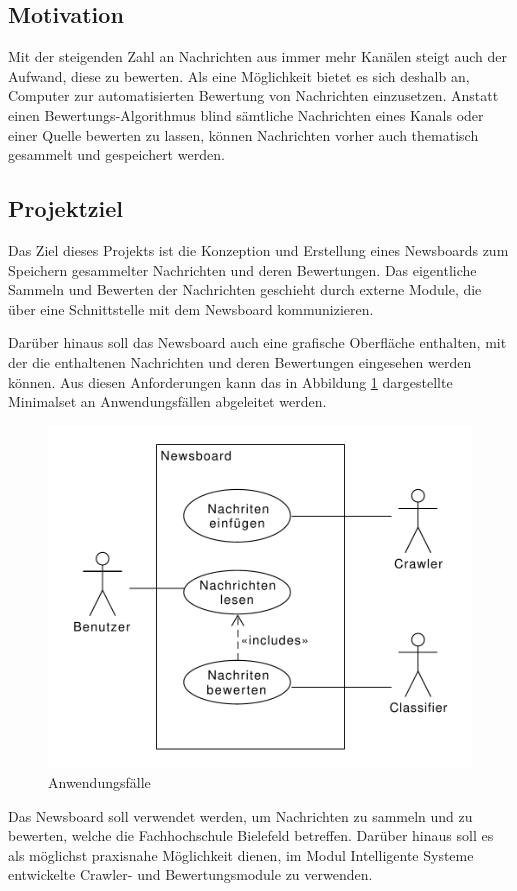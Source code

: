 \subsection{Motivation}
Mit der steigenden Zahl an Nachrichten aus immer mehr Kanälen steigt auch der Aufwand,
diese zu bewerten. Als eine Möglichkeit bietet es sich deshalb an,
Computer zur automatisierten Bewertung von Nachrichten einzusetzen.
Anstatt einen Bewertungs-Algorithmus blind sämtliche Nachrichten eines Kanals
oder einer Quelle bewerten zu lassen, können Nachrichten vorher auch thematisch gesammelt
und gespeichert werden.

\subsection{Projektziel}
Das Ziel dieses Projekts ist die Konzeption und Erstellung eines Newsboards zum Speichern
gesammelter Nachrichten und deren Bewertungen. Das eigentliche Sammeln
und Bewerten der Nachrichten geschieht durch externe Module,
die über eine Schnittstelle mit dem Newsboard kommunizieren.

Darüber hinaus soll das Newsboard auch eine grafische Oberfläche enthalten,
mit der die enthaltenen Nachrichten und deren Bewertungen eingesehen werden können.
Aus diesen Anforderungen kann das in Abbildung \ref{fig:use-cases} dargestellte
Minimalset an Anwendungsfällen abgeleitet werden.

\begin{figure}[h]
	\centering 
	\includegraphics[scale=0.75]{assets/use-cases.pdf}
	\caption{Anwendungsfälle}
	\label{fig:use-cases}
\end{figure}

Das Newsboard soll verwendet werden, um Nachrichten zu sammeln und zu bewerten,
welche die Fachhochschule Bielefeld betreffen. Darüber hinaus soll es
als möglichst praxisnahe Möglichkeit dienen, im Modul Intelligente Systeme entwickelte
Crawler- und Bewertungsmodule zu verwenden.
